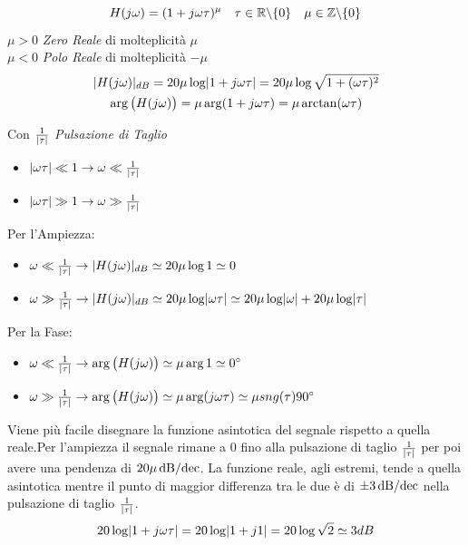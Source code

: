 \[ H(j\omega) = (1+j\omega\tau)^{\mu} \quad \tau \in \R \backslash \{0\} \quad \mu \in \Z \backslash \{0\}  \]
$ \mu>0 $ \emph{Zero Reale} di molteplicità $ \mu $\\
$ \mu<0 $ \emph{Polo Reale} di molteplicità $ -\mu $
\begin{gather*}
	\abs{H(j\omega)}_{dB} = 20 \mu \log \abs{1+j\omega\tau} = 20 \mu \log \sqrt{1+(\omega\tau)^2} \\
	\arg \big(H(j\omega)\big) = \mu \arg(1+j\omega\tau) = \mu \arctan(\omega\tau)
\end{gather*}

Con $ \frac{1}{\abs{\tau}} $ \emph{Pulsazione di Taglio}
\begin{itemize}
	\item $ \abs{\omega\tau} \ll 1 \rightarrow \omega \ll \frac{1}{\abs{\tau}}$
	\item $ \abs{\omega\tau} \gg 1 \rightarrow \omega \gg \frac{1}{\abs{\tau}}$
\end{itemize}

Per l'Ampiezza:
\begin{itemize}
	\item $ \omega \ll \frac{1}{\abs{\tau}} \rightarrow \abs{H(j\omega)}_{dB} \simeq 20\mu \log 1 \simeq 0 $
	\item $ \omega \gg \frac{1}{\abs{\tau}} \rightarrow \abs{H(j\omega)}_{dB} \simeq 20\mu \log \abs{\omega\tau} \simeq 20 \mu \log \abs{\omega} +20 \mu \log \abs{\tau} $
\end{itemize}

Per la Fase:
\begin{itemize}
	\item $ \omega \ll \frac{1}{\abs{\tau}} \rightarrow \arg \big(H(j\omega)\big) \simeq \mu \arg 1 \simeq \ang{0} $ 
	\item $ \omega \gg \frac{1}{\abs{\tau}} \rightarrow \arg \big(H(j\omega)\big) \simeq \mu \arg (j\omega\tau) \simeq \mu \sng(\tau)\ang{90} $ 
\end{itemize}

Viene più facile disegnare la funzione asintotica del segnale rispetto a quella reale.Per l'ampiezza il segnale rimane a $ 0 $ fino alla pulsazione di taglio $ \frac{1}{\abs{\tau}} $ per poi avere una pendenza di $ 20 \mu \dbdec $. La funzione reale, agli estremi, tende a quella asintotica mentre il punto di maggior differenza tra le due è di $ \pm 3 \dbdec $ nella pulsazione di taglio $ \frac{1}{\abs{\tau}} $.
\[ 20\log \abs{1+j\omega\tau} = 20\log \abs{1+j1} = 20\log \sqrt{2} \simeq 3 dB \] 

